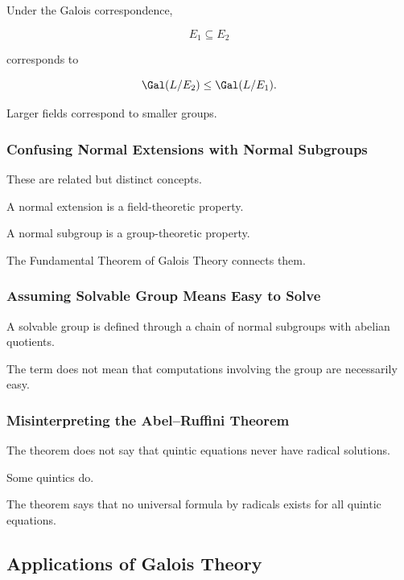 Under the Galois correspondence,

\[ E_1\subseteq E_2 \]

corresponds to

\[ \Gal(L/E_2)\leq\Gal(L/E_1). \]

Larger fields correspond to smaller groups.

\subsubsection{Confusing Normal Extensions with Normal Subgroups}

These are related but distinct concepts.

A normal extension is a field-theoretic property.

A normal subgroup is a group-theoretic property.

The Fundamental Theorem of Galois Theory connects them.

\subsubsection{Assuming Solvable Group Means Easy to Solve}

A solvable group is defined through a chain of normal subgroups with abelian
quotients.

The term does not mean that computations involving the group are necessarily
easy.

\subsubsection{Misinterpreting the Abel--Ruffini Theorem}

The theorem does not say that quintic equations never have radical solutions.

Some quintics do.

The theorem says that no universal formula by radicals exists for all
quintic equations.

\subsection{Applications of Galois Theory}
\label{subsec:galois-applications}

